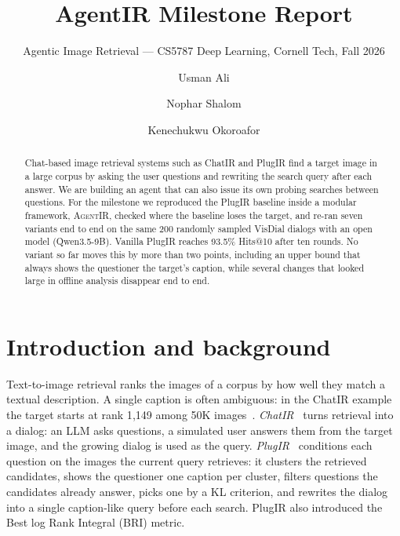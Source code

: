 \documentclass[sigconf,nonacm]{acmart}
\begin{document}
\title{AgentIR Milestone Report}
\subtitle{Agentic Image Retrieval --- CS5787 Deep Learning, Cornell Tech, Fall 2026}

\author{Usman Ali}

\author{Nophar Shalom}

\author{Kenechukwu Okoroafor}

\renewcommand{\shortauthors}{Ali, Shalom and Okoroafor}

\begin{abstract}
Chat-based image retrieval systems such as ChatIR and PlugIR find a target image in a large
corpus by asking the user questions and rewriting the search query after each answer. We are
building an agent that can also issue its own probing searches between questions. For the
milestone we reproduced the PlugIR baseline inside a modular framework, \textsc{AgentIR}, checked
where the baseline loses the target, and re-ran seven variants end to end on the same 200 randomly
sampled VisDial dialogs with an open model (Qwen3.5-9B). Vanilla PlugIR reaches 93.5\% Hits@10
after ten rounds. No variant so far moves this by more than two points, including an upper bound
that always shows the questioner the target's caption, while several changes that looked large in
offline analysis disappear end to end.
\end{abstract}

\maketitle

\section{Introduction and background}
Text-to-image retrieval ranks the images of a corpus by how well they match a textual
description. A single caption is often ambiguous: in the ChatIR example the target starts at
rank 1{,}149 among 50K images~\cite{levy2023chatir}. \emph{ChatIR}~\cite{levy2023chatir} turns
retrieval into a dialog: an LLM asks questions, a simulated user answers them from the target
image, and the growing dialog is used as the query. \emph{PlugIR}~\cite{lee2024plugir} conditions
each question on the images the current query retrieves: it clusters the retrieved candidates,
shows the questioner one caption per cluster, filters questions the candidates already answer,
picks one by a KL criterion, and rewrites the dialog into a single caption-like query before each
search. PlugIR also introduced the Best log Rank Integral (BRI) metric.
\end{document}
